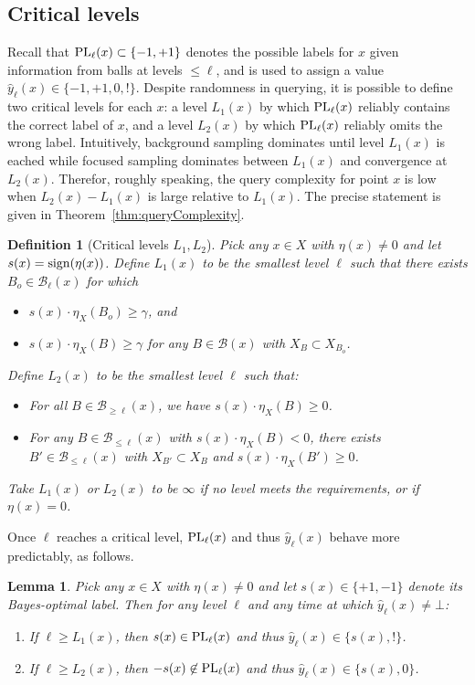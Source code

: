 \documentclass[twoside]{article}
\def\B{{\mathcal B}}
\def\yh{{\widehat{y}}}
\def\sign{{\rm sign}}
\def\PL{{\mbox{\rm PL}}}
\newtheorem{lemma}[thm]{Lemma}
\newtheorem{defn}[thm]{Definition}
\begin{document}
\subsection{Critical levels}

Recall that $\PL_\ell(x) \subset \{-1,+1\}$ denotes the possible labels for $x$ given information from balls at levels $\leq \ell$, and is used to assign a value $\yh_\ell(x) \in \{-1,+1,0,!\}$. Despite randomness in querying, it is possible to define two critical levels for each $x$: a level $L_1(x)$ by which $\PL_\ell(x)$ reliably contains the correct label of $x$, and a level $L_2(x)$ by which $\PL_\ell(x)$ reliably omits the wrong label. Intuitively, background sampling dominates until level $L_1(x)$ is eached while focused sampling dominates between $L_1(x)$ and convergence at $L_2(x)$.
Therefor, roughly speaking, the query complexity for point $x$ is low when $L_2(x)-L_1(x)$ is large relative to $L_1(x)$. The precise statement is given in Theorem~\ref{thm:queryComplexity}.

\begin{defn}[Critical levels $L_1,L_2$]
Pick any $x \in X$ with $\eta(x) \neq 0$ and let $s(x) = \sign(\eta(x))$. Define $L_1(x)$ to be the smallest level $\ell$ such that there exists $B_o \in \B_\ell(x)$ for which
\begin{itemize}[leftmargin=0.5cm]
\item $s(x) \cdot \eta_X(B_o) \geq \gamma$, and
\item $s(x) \cdot \eta_X(B) \geq \gamma$ for any $B \in \B(x)$ with $X_{B} \subset X_{B_o}$.
\end{itemize}
Define $L_2(x)$ to be the smallest level $\ell$ such that:
\begin{itemize}[leftmargin=0.5cm]
\item For all $B \in \B_{\geq \ell}(x)$, we have $s(x) \cdot \eta_X(B) \geq 0$.
\item For any $B \in \B_{\leq \ell}(x)$ with $s(x) \cdot \eta_X(B) < 0$, there exists $B' \in \B_{\leq \ell}(x)$ with $X_{B'} \subset X_B$ and $s(x) \cdot \eta_X(B') \geq 0$.
\end{itemize}
Take $L_1(x)$ or $L_2(x)$ to be $\infty$ if no level meets the requirements, or if $\eta(x) = 0$. 
\label{defn:L12}
\end{defn}

Once $\ell$ reaches a critical level, $\PL_\ell(x)$ and thus $\yh_\ell(x)$ behave more predictably, as follows.
\begin{lemma}
Pick any $x \in X$ with $\eta(x) \neq 0$ and let $s(x) \in \{+1,-1\}$ denote its Bayes-optimal label. Then for any level $\ell$ and any time at which $\yh_\ell(x) \neq \bot$:
\begin{enumerate}
\item[(a)] If $\ell \geq L_1(x)$, then $s(x) \in \PL_\ell(x)$ and thus $\yh_\ell(x) \in \{s(x), !\}$. 
\item[(b)] If $\ell \geq L_2(x)$, then $-s(x) \not\in \PL_\ell(x)$ and thus $\yh_\ell(x) \in \{s(x), 0\}$.
\end{enumerate}
\label{lemma:boundary}
\end{lemma}
\end{document}
